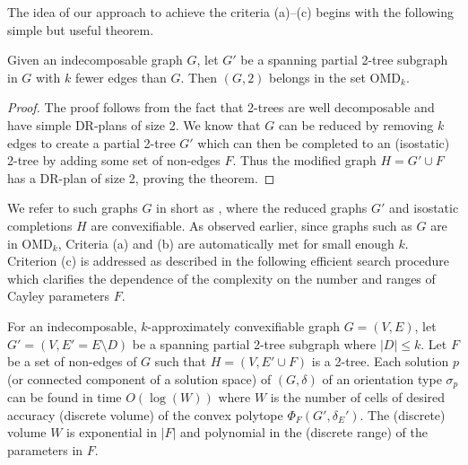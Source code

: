 The idea of our approach to achieve the criteria (a)--(c) begins with the following simple but useful theorem.

\begin{theorem}\label{theorem:omdk}
    Given an indecomposable graph $G$, let $G'$ be a spanning partial 2-tree subgraph in $G$ with $k$ fewer edges than $G$. Then $(G,2)$ belongs in the set OMD$_k$.
\end{theorem}

\begin{proof}
    The proof follows from the fact that 2-trees are well decomposable and have simple DR-plans of size 2. We know that $G$ can be reduced by removing $k$ edges to create a partial 2-tree $G'$ which can then be completed to an (isostatic) 2-tree by adding some set of non-edges $F$. Thus the modified graph $H = G'\cup F$ has  a DR-plan of size 2, proving the theorem.
\end{proof}


We refer to such graphs $G$ in short as , where the reduced graphs $G'$ and isostatic completions $H$ are convexifiable. As observed earlier, since graphs such as $G$ are in OMD$_k$, Criteria (a) and (b) are automatically met for small enough $k$. Criterion (c) is addressed as described in the following efficient search procedure which clarifies the dependence of the complexity on the number and ranges  of Cayley parameters $F$.

\begin{theorem*}
\label{theorem:criterionc}
    For an indecomposable, $k$-approximately convexifiable graph $G = (V,E)$, let $G' = (V,E' =E\setminus D)$ be a spanning partial 2-tree subgraph where $|D| \le  k$. Let  $F$ be a set of non-edges of $G$ such that $H = (V, E'\cup F)$ is a 2-tree. Each solution $p$ (or connected component of a solution space) of $(G,\delta)$ of an orientation type $\sigma_p$ can be found in time $O(\log(W))$ where $W$ is the number of cells of desired accuracy (discrete volume) of the convex polytope $\Phi_F(G',\delta_E')$. The (discrete) volume $W$ is exponential in $|F|$ and polynomial in the (discrete range) of the parameters in $F$.
\end{theorem*}

